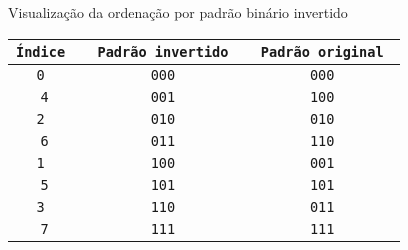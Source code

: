 \begin{frame}[fragile]{Visualização da ordenação por padrão binário invertido}

    \begin{table}
    \centering
    \begin{tabular}{>{\tt}c>{\tt}c>{\tt}c}
        \toprule
        \textbf{Índice} & \textbf{Padrão invertido} & \textbf{Padrão original} \\
        \midrule
            0 & 000 & 000 \\ 
            \rowcolor[gray]{0.9}
            4 & 001 & 100 \\ 
            2 & 010 & 010 \\ 
            \rowcolor[gray]{0.9}
            6 & 011 & 110 \\ 
            1 & 100 & 001 \\ 
            \rowcolor[gray]{0.9}
            5 & 101 & 101 \\ 
            3 & 110 & 011 \\ 
            \rowcolor[gray]{0.9}
            7 & 111 & 111 \\ 
    \end{tabular}
    \end{table}

\end{frame}
